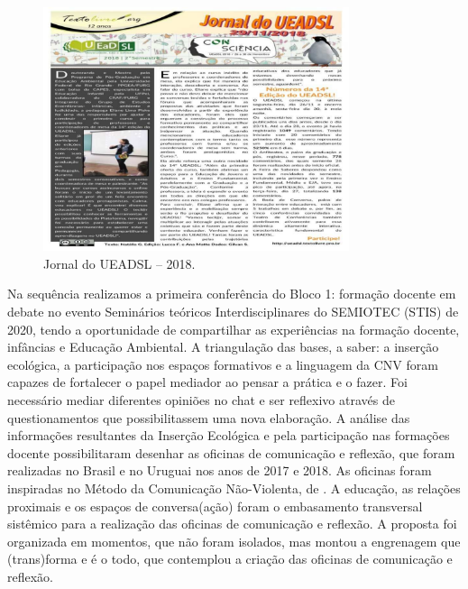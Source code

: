 \documentclass{textolivre-html}
\begin{document}
\begin{figure}[h!]
 \centering
 \includegraphics[width=0.8\textwidth]{figure02.pdf}
 \caption{Jornal do UEADSL -- 2018.}
 \label{fig-fig02}
\end{figure}

Na sequência realizamos a primeira conferência do Bloco 1: formação docente em debate no evento Seminários teóricos Interdisciplinares do SEMIOTEC (STIS) de 2020, tendo a oportunidade de compartilhar as experiências na formação docente, infâncias e Educação Ambiental. A triangulação das bases, a saber: a inserção ecológica, a participação nos espaços formativos e a linguagem da CNV foram capazes de fortalecer o papel mediador ao pensar a prática e o fazer. Foi necessário mediar diferentes opiniões no chat e ser reflexivo através de questionamentos que possibilitassem uma nova elaboração. A análise das informações resultantes da Inserção Ecológica e pela participação nas formações docente possibilitaram desenhar as oficinas de comunicação e reflexão, que foram realizadas no Brasil e no Uruguai nos anos de 2017 e 2018. As oficinas foram inspiradas no Método da Comunicação Não-Violenta, de \textcite{rosenberg2006}. A educação, as relações proximais e os espaços de conversa(ação) foram o embasamento transversal sistêmico para a realização das oficinas de comunicação e reflexão. A proposta foi organizada em momentos, que não foram isolados, mas montou a engrenagem que (trans)forma e é o todo, que contemplou a criação das oficinas de comunicação e reflexão.
\end{document}
